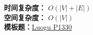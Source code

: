 \textbf{时间复杂度：} $O(|V| + |E|)$ \\
\textbf{空间复杂度：} $O(|V|)$ \\
\textbf{模板题：}\href{https://www.luogu.com.cn/problem/P1330}{Luogu P1330}
